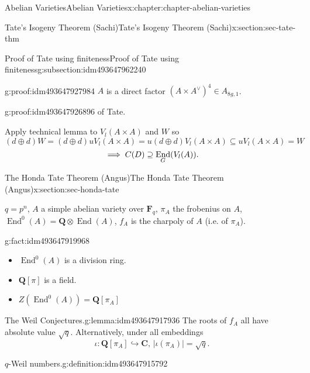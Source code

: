 \documentclass[oneside,10pt,]{book}
\newcommand{\qedhere}{\relax}
\numberwithin{equation}{section}
\newcommand{\lb}{[}
\newcommand{\rb}{]}
\newcommand{\QQ}{\mathbf{Q}}
\newcommand{\CC}{\mathbf{C}}
\newcommand{\FF}{\mathbf{F}}
\DeclareMathOperator{\End}{End}
\begin{document}
\begin{chapterptx}{Abelian Varieties}{}{Abelian Varieties}{}{}{x:chapter:chapter-abelian-varieties}
\begin{sectionptx}{Tate's Isogeny Theorem (Sachi)}{}{Tate's Isogeny Theorem (Sachi)}{}{}{x:section:sec-tate-thm}
\begin{subsectionptx}{Proof of Tate using finiteness}{}{Proof of Tate using finiteness}{}{}{g:subsection:idm493647962240}
\begin{proofptx}{}{g:proof:idm493647927984}
\(A\) is a direct factor \((A\times A^\vee)^4 \in A_{8g,1}\).%
\end{proofptx}
\begin{proofptx}{}{g:proof:idm493647926896}
of Tate.%
\par
Apply technical lemma to \(V_l(A\times A)\) and \(W\) so%
\begin{equation*}
(d\oplus d) W = (d \oplus d) uV_l(A\times A) = u(d\oplus d) V_l(A\times A) \subseteq uV_l(A\times A) = W
\end{equation*}
%
\begin{equation*}
\implies C(D) \supseteq \End_G(V_l(A))\text{.}\qedhere
\end{equation*}
%
\end{proofptx}
\end{subsectionptx}
\end{sectionptx}
%
%
\typeout{************************************************}
\typeout{************************************************}
%
\begin{sectionptx}{The Honda Tate Theorem (Angus)}{}{The Honda Tate Theorem (Angus)}{}{}{x:section:sec-honda-tate}
\begin{introduction}{}%
\(q = p^n\), \(A\) a simple abelian variety over \(\FF_q\), \(\pi_A\) the frobenius on \(A\), \(\End^0(A) = \QQ\otimes \End(A)\), \(f_A\) is the charpoly of \(A\) (i.e. of \(\pi_A\)).%
\begin{fact}{}{}{g:fact:idm493647919968}%
%
\begin{itemize}[label=\textbullet]
\item{}\(\End^0(A)\) is a division ring.%
\item{}\(\QQ\lb \pi\rb\) is a field.%
\item{}\(\displaystyle Z(\End^0(A)) = \QQ\lb \pi_A\rb\)%
\end{itemize}
%
\end{fact}
\begin{lemma}{The Weil Conjectures.}{}{g:lemma:idm493647917936}%
The roots of \(f_A\) all have absolute value \(\sqrt q\). Alternatively, under all embeddings%
\begin{equation*}
\iota \colon \QQ\lb \pi_A\rb \hookrightarrow \CC,\,|\iota(\pi_A)| = \sqrt q\text{.}
\end{equation*}
%
\end{lemma}
\begin{definition}{\(q\)-Weil numbers.}{g:definition:idm493647915792}%

\end{definition}
\end{introduction}
\end{sectionptx}
\end{chapterptx}
\end{document}
